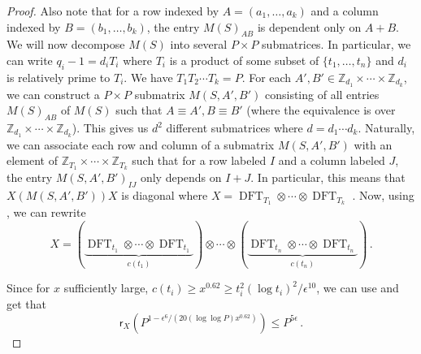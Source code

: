 \documentclass{toc}
\renewcommand\Z{{\mathbb{Z}}}
\DeclareMathOperator{\DFT}{DFT}
\begin{document}
\begin{proof}
Also note that for a row indexed by $A = (a_1, \dots , a_k)$ and a column indexed by $B = (b_1, \dots , b_k)$, the entry $M(S)_{AB}$ is dependent only on $A+B$.  We will now decompose $M(S)$ into several $P \times P$ submatrices.  In particular, we can write $q_i-1 = d_i T_i$ where $T_i$ is a product of some subset of $\{t_1, \dots , t_n \}$ and $d_i$ is relatively prime to $T_i$.  We have $T_1T_2\cdots T_k = P$.  For each $A',B' \in \Z_{d_1} \times \cdots \times \Z_{d_k}$, we can construct a $P \times P$ submatrix $M(S,A',B')$ consisting of all entries $M(S)_{AB}$ of $M(S)$ such that $A \equiv A', B \equiv B'$ (where the equivalence is over $\Z_{d_1} \times \cdots \times \Z_{d_k}$).  This gives us $d^2$ different submatrices where $d =  d_1\cdots d_k$.  Naturally, we can associate each row and column of a submatrix $M(S,A',B')$ with an element of $\Z_{T_1} \times \cdots \times \Z_{T_k}$ such that for a row labeled $I$ and a column labeled $J$, the entry $M(S,A',B')_{IJ}$ only depends on $I+J$.  In particular, this means that $X\left(M(S,A',B')\right)X$ is diagonal where %
$X = \DFT_{T_1} \otimes \cdots \otimes \DFT_{T_k}$ %
.  Now, using , we can rewrite 
%
%
%
%
\[
X = (\underbrace{\DFT_{t_1} \otimes \cdots \otimes \DFT_{t_1}}_\text{$c(t_1)$}) \otimes \cdots \otimes  (\underbrace{\DFT_{t_n} \otimes \cdots \otimes \DFT_{t_n}}_\text{$c(t_n)$}) \,.
\] %

Since for $x$ sufficiently large, $c(t_i) \geq x^{0.62} \geq t_i^2(\log t_i)^2/\epsilon^{10}$, we can use  and get that
\[
\textsf{r}_X\left( P^{1 - \epsilon^6/(20(\log \log P) x^{0.62})}\right) \leq  P^{5 \epsilon} \,.
\]




\end{proof}
\end{document}
